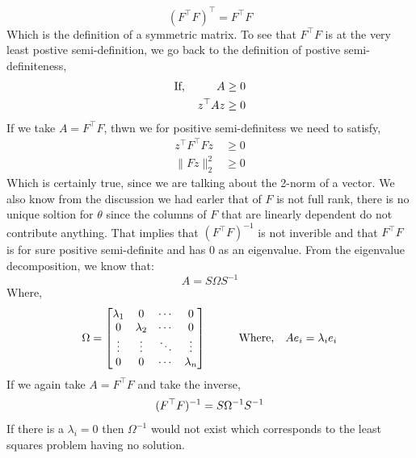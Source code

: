 \begin{equation}
	(F^{\top}F)^{\top} = F^{\top}F
\end{equation}
Which is the definition of a symmetric matrix. To see that $F^{\top}F$ is at the very least postive semi-definition, we go back to the definition of postive semi-definiteness, 
\begin{align}
	\text{If,} \hspace{10mm} A &\geq 0\\
	z^{\top}Az &\geq 0
\end{align}
If we take $A = F^{\top}F$, thwn we for positive semi-definitess we need to satisfy, 
\begin{align} 
	z^{\top}F^{\top}Fz &\geq 0\\
	\|Fz\|^{2}_{2} &\geq 0 
\end{align}
Which is certainly true, since we are talking about the 2-norm of a vector. We also know from the discussion we had earler that of $F$ is not full rank, there is no unique soltion for $\theta$ since the columns of $F$ that are linearly dependent do not contribute anything. That implies that $(F^{\top}F)^{-1}$ is not inverible and that $F^{\top}F$ is for sure positive semi-definite and has 0 as an eigenvalue. From the eigenvalue decomposition, we know that: 
\begin{equation}
	A = S\Omega S^{-1}
\end{equation}
Where, 
\begin{equation}
	\Omega = 
	\begin{bmatrix}
		\lambda_{1} & 0 & \cdots & 0\\
		0 & \lambda_{2} & \cdots & 0\\
		\vdots & \vdots & \ddots & \vdots\\
		0 & 0 & \cdots & \lambda_{n}
	\end{bmatrix}
\hspace{10mm} \text{Where,} \quad Ae_{i} = \lambda_{i}e_{i}
\end{equation}
If we again take $A = F^{\top}F$ and take the inverse, 
\begin{equation}
	(F^{\top}F)^{-1} = S\Omega^{-1}S^{-1}\\
\end{equation}
If there is a $\lambda_{i} = 0$ then $\Omega^{-1}$ would not exist which corresponds to the least squares problem having no solution. 
